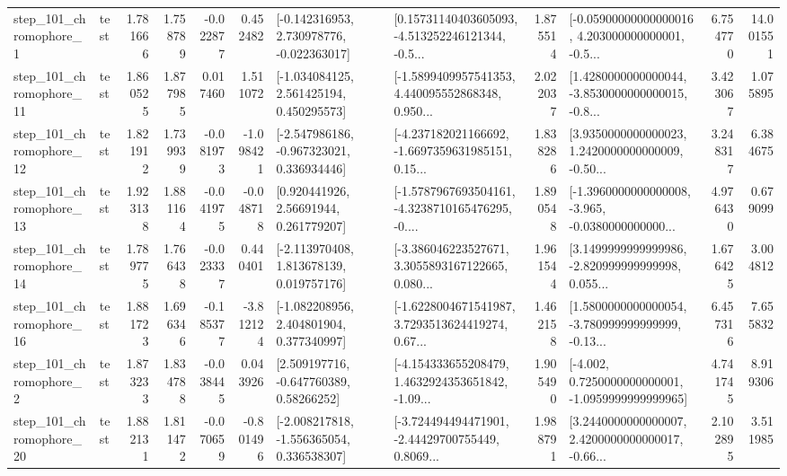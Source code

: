 \begin{tabular}{llrrrrllrlrr}
   step\_101\_chromophore\_1 &      test &      1.781666 &    1.758789 &     -0.022877 &  0.452482 &   [-0.142316953, 2.730978776, -0.022363017] &  [0.15731140403605093, -4.513252246121344, -0.5... &       1.875514 &  [-0.05900000000000016, 4.203000000000001, -0.5... &            6.754770 &         14.001551 \\
  step\_101\_chromophore\_11 &      test &      1.860525 &    1.877985 &      0.017460 &  1.511072 &    [-1.034084125, 2.561425194, 0.450295573] &  [-1.5899409957541353, 4.440095552868348, 0.950... &       2.022037 &  [1.4280000000000044, -3.8530000000000015, -0.8... &            3.423067 &          1.075895 \\
  step\_101\_chromophore\_12 &      test &      1.821912 &    1.739939 &     -0.081973 & -1.098421 &   [-2.547986186, -0.967323021, 0.336934446] &  [-4.237182021166692, -1.6697359631985151, 0.15... &       1.838286 &  [3.9350000000000023, 1.2420000000000009, -0.50... &            3.248317 &          6.384675 \\
  step\_101\_chromophore\_13 &      test &      1.923138 &    1.881164 &     -0.041975 & -0.048718 &      [0.920441926, 2.56691944, 0.261779207] &  [-1.5787967693504161, -4.3238710165476295, -0.... &       1.890548 &  [-1.3960000000000008, -3.965, -0.0380000000000... &            4.976430 &          0.679099 \\
  step\_101\_chromophore\_14 &      test &      1.789775 &    1.766438 &     -0.023337 &  0.440401 &    [-2.113970408, 1.813678139, 0.019757176] &  [-3.386046223527671, 3.3055893167122665, 0.080... &       1.961544 &  [3.1499999999999986, -2.820999999999998, 0.055... &            1.676425 &          3.004812 \\
  step\_101\_chromophore\_16 &      test &      1.881723 &    1.696346 &     -0.185377 & -3.812124 &    [-1.082208956, 2.404801904, 0.377340997] &  [-1.6228004671541987, 3.7293513624419274, 0.67... &       1.462158 &  [1.5800000000000054, -3.780999999999999, -0.13... &            6.457316 &          7.655832 \\
   step\_101\_chromophore\_2 &      test &      1.873233 &    1.834788 &     -0.038445 &  0.043926 &     [2.509197716, -0.647760389, 0.58266252] &  [-4.154333655208479, 1.4632924353651842, -1.09... &       1.905490 &  [-4.002, 0.7250000000000001, -1.0959999999999965] &            4.741745 &          8.919306 \\
  step\_101\_chromophore\_20 &      test &      1.882131 &    1.811472 &     -0.070659 & -0.801496 &   [-2.008217818, -1.556365054, 0.336538307] &  [-3.724494494471901, -2.44429700755449, 0.8069... &       1.988791 &  [3.2440000000000007, 2.4200000000000017, -0.66... &            2.102895 &          3.511985 \\

\end{tabular}
